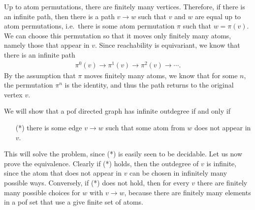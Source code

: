 {
    Up to atom permutations, there are finitely many vertices. Therefore, if there is an infinite path, then there is a path $v \to w$ such that $v$ and $w$ are equal up to atom permutations, i.e.~there is some atom permutation $\pi$ such that $w = \pi(v)$. We can choose this permutation so that it moves only finitely many atoms, namely those that appear in $v$. Since reachability is equivariant, we know that there is an infinite path
    \begin{align*}
        \pi^0(v) \to \pi^1(v) \to \pi^2(v) \to \cdots .
    \end{align*} 
    By the assumption that $\pi$ moves finitely many atoms, we know that for some $n$, the permutation $\pi^n$ is the identity, and thus the path returns to the original vertex $v$. 
}


{
We will show that  a pof directed graph has infinite outdegree if and only if 
\begin{itemize}
    \item[(*)] there is some edge $v \to w$ such that some atom from $w$ does not appear in $v$.
\end{itemize} 
This will solve the problem, since (*) is easily seen to be decidable. Let us now prove the equivalence. Clearly if (*) holds, then the outdegree of $v$ is infinite, since the atom that does not appear in $v$ can be chosen in infinitely many possible ways. Conversely, if (*) does not hold, then for every $v$ there are finitely many possible choices for $w$ with $v \to w$, because there are finitely many elements in a pof set that use a give finite set of atoms.
}



